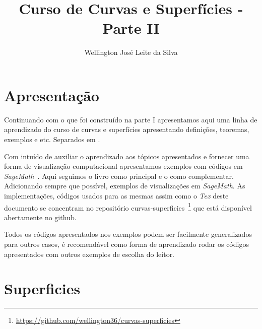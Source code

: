 \documentclass[12pt]{article}
\title{Curso de Curvas e Superfícies - Parte II}
\author{Wellington José Leite da Silva\inst{1}}
\date{}
\newcommand{\furl}[1]{\footnote{\url{#1}}}
\begin{document}
\maketitle






\section*{Apresentação}\label{s1}
Continuando com o que foi construído na parte I apresentamos aqui uma linha de aprendizado do curso de curvas e superfícies apresentando definições, teoremas, exemplos e etc. Separados em . 

Com intuído de auxiliar o aprendizado aos tópicos apresentados e fornecer uma forma de visualização computacional apresentamos exemplos com códigos em \textit{SageMath}~\cite{sagemath}. Aqui seguimos o livro \cite{bookmain} como principal e o \cite{manfredo} como complementar. Adicionando sempre que possível, exemplos de visualizações em \textit{SageMath}. As implementações, códigos usados para as mesmas assim como o \textit{Tex} deste documento se concentram no repositório curvas-superficies~\furl{https://github.com/wellington36/curvas-superficies} que está disponível abertamente no github.

Todos os códigos apresentados nos exemplos podem ser facilmente generalizados para outros casos, é recomendável como forma de aprendizado rodar os códigos apresentados com outros exemplos de escolha do leitor.

\section{Superficies}



\end{document}
